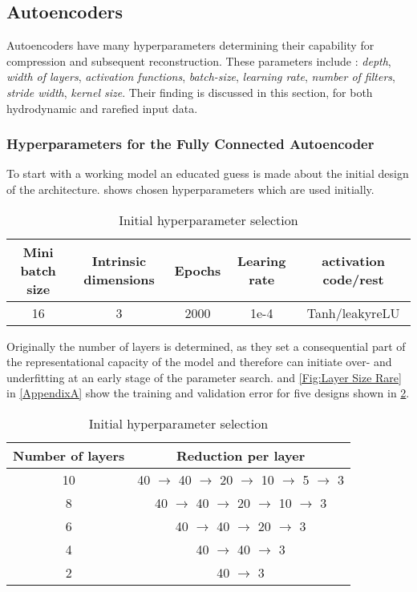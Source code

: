 \subsection{Autoencoders}

Autoencoders have many hyperparameters determining their capability for compression and subsequent reconstruction. These parameters include : \textit{depth}, \textit{width of layers}, \textit{activation functions}, \textit{batch-size}, \textit{learning rate}, \textit{number of filters}, \textit{stride width}, \textit{kernel size}. Their finding is discussed in this section, for both hydrodynamic and rarefied input data.\\
\subsubsection{Hyperparameters for the Fully Connected Autoencoder}\label{Fully Connected}
To start with a working model an educated guess is made about the initial design of the architecture.  shows chosen hyperparameters  which are used initially.
\begin{table}[!htbp]\centering
	\begin{tabular}{ |c|c|c|c|c| }
		\hline
		Mini batch size & Intrinsic dimensions& Epochs & Learing rate & activation code/rest\\ [.5ex]
		\hline
		16 & 3 & 2000& 1e-4 & Tanh/leakyreLU\\ \hline
	\end{tabular}
	\caption{Initial hyperparameter selection}
	\label{Tab:First Guess}
\end{table}
Originally the number of layers is determined, as they set a consequential part of the representational capacity of the model and therefore can initiate over- and underfitting at an early stage of the parameter search.  and \cref{Fig:Layer Size Rare} in \cref{AppendixA} show the training and validation error for five designs shown in \cref{Tab:Layer Size}.\\
\begin{table}[!htbp]\centering
	\begin{tabular}{ |c|c| }
		\hline
		Number of layers & Reduction per layer \\ [.5ex]
		\hline
		10 & 40 \(\rightarrow\) 40 \(\rightarrow\) 20  \(\rightarrow\) 10 \(\rightarrow\) 5 \(\rightarrow\) 3\\ \hline
		8 & 40 \(\rightarrow\) 40 \(\rightarrow\) 20  \(\rightarrow\) 10 \(\rightarrow\) 3\\ \hline
		6 & 40 \(\rightarrow\) 40 \(\rightarrow\) 20  \(\rightarrow\) 3\\ \hline
		4 & 40 \(\rightarrow\) 40 \(\rightarrow\) 3\\ \hline
		2 & 40 \(\rightarrow\) 3\\ \hline
	\end{tabular}
	\caption{Initial hyperparameter selection}
	\label{Tab:Layer Size}
\end{table}
